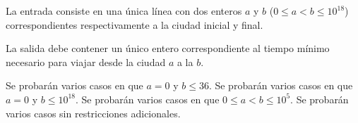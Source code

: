 \documentclass{oci}
\begin{document}
\begin{inputDescription}
  La entrada consiste en una única línea con dos enteros $a$ y $b$ ($0\leq a < b \leq 10^{18}$)
  correspondientes respectivamente a la ciudad inicial y final.
\end{inputDescription}

\begin{outputDescription}
  La salida debe contener un único entero correspondiente al tiempo mínimo necesario
  para viajar desde la ciudad $a$ a la $b$.
\end{outputDescription}

\begin{scoreDescription}
  Se probarán varios casos en que $a = 0$ y $b \leq 36$.
  Se probarán varios casos en que $a = 0$ y $b \leq 10^{18}$.
  Se probarán varios casos en que $0 \leq a < b \leq 10^5$.
  Se probarán varios casos sin restricciones adicionales.
\end{scoreDescription}

\begin{sampleDescription}
\end{sampleDescription}
\end{document}

